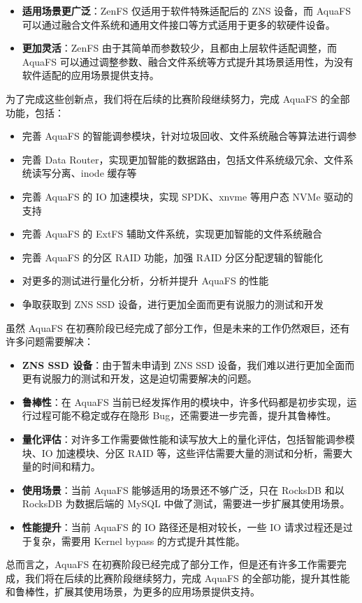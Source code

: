 \begin{itemize}
  \item \textbf{适用场景更广泛}：ZenFS 仅适用于软件特殊适配后的 ZNS 设备，而 AquaFS 可以通过融合文件系统和通用文件接口等方式适用于更多的软硬件设备。
  \item \textbf{更加灵活}：ZenFS 由于其简单而参数较少，且都由上层软件适配调整，而 AquaFS 可以通过调整参数、融合文件系统等方式提升其场景适用性，为没有软件适配的应用场景提供支持。
\end{itemize}

为了完成这些创新点，我们将在后续的比赛阶段继续努力，完成 AquaFS 的全部功能，包括：

\begin{itemize}
  \item 完善 AquaFS 的智能调参模块，针对垃圾回收、文件系统融合等算法进行调参
  \item 完善 Data Router，实现更加智能的数据路由，包括文件系统级冗余、文件系统读写分离、inode 缓存等
  \item 完善 AquaFS 的 IO 加速模块，实现 SPDK、xnvme 等用户态 NVMe 驱动的支持
  \item 完善 AquaFS 的 ExtFS 辅助文件系统，实现更加智能的文件系统融合
  \item 完善 AquaFS 的分区 RAID 功能，加强 RAID 分区分配逻辑的智能化
  \item 对更多的测试进行量化分析，分析并提升 AquaFS 的性能
  \item 争取获取到 ZNS SSD 设备，进行更加全面而更有说服力的测试和开发
\end{itemize}

虽然 AquaFS 在初赛阶段已经完成了部分工作，但是未来的工作仍然艰巨，还有许多问题需要解决：

\begin{itemize}
  \item \textbf{ZNS SSD 设备}：由于暂未申请到 ZNS SSD 设备，我们难以进行更加全面而更有说服力的测试和开发，这是迫切需要解决的问题。
  \item \textbf{鲁棒性}：在 AquaFS 当前已经发挥作用的模块中，许多代码都是初步实现，运行过程可能不稳定或存在隐形 Bug，还需要进一步完善，提升其鲁棒性。
  \item \textbf{量化评估}：对许多工作需要做性能和读写放大上的量化评估，包括智能调参模块、IO 加速模块、分区 RAID 等，这些评估需要大量的测试和分析，需要大量的时间和精力。
  \item \textbf{使用场景}：当前 AquaFS 能够适用的场景还不够广泛，只在 RocksDB 和以 RocksDB 为数据后端的 MySQL 中做了测试，需要进一步扩展其使用场景。
  \item \textbf{性能提升}：当前 AquaFS 的 IO 路径还是相对较长，一些 IO 请求过程还是过于复杂，需要用 Kernel bypass 的方式提升其性能。
\end{itemize}

总而言之，AquaFS 在初赛阶段已经完成了部分工作，但是还有许多工作需要完成，我们将在后续的比赛阶段继续努力，完成 AquaFS 的全部功能，提升其性能和鲁棒性，扩展其使用场景，为更多的应用场景提供支持。

